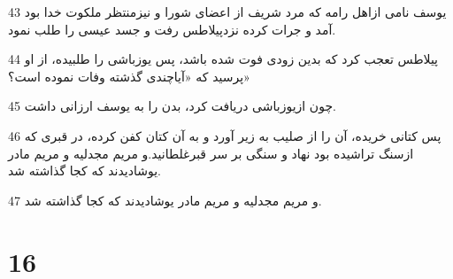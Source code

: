\par 43 یوسف نامی ازاهل رامه که مرد شریف از اعضای شورا و نیزمنتظر ملکوت خدا بود آمد و جرات کرده نزدپیلاطس رفت و جسد عیسی را طلب نمود.
\par 44 پیلاطس تعجب کرد که بدین زودی فوت شده باشد، پس یوزباشی را طلبیده، از او پرسید که «آیاچندی گذشته وفات نموده است؟»
\par 45 چون ازیوزباشی دریافت کرد، بدن را به یوسف ارزانی داشت.
\par 46 پس کتانی خریده، آن را از صلیب به زیر آورد و به آن کتان کفن کرده، در قبری که ازسنگ تراشیده بود نهاد و سنگی بر سر قبرغلطانید.و مریم مجدلیه و مریم مادر یوشادیدند که کجا گذاشته شد.
\par 47 و مریم مجدلیه و مریم مادر یوشادیدند که کجا گذاشته شد.

\chapter{16}

